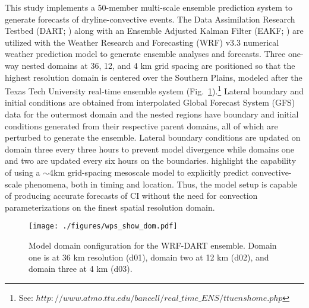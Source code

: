 \documentclass{ttuthes2007}
\newcommand{\tab}{\hspace*{2em}}  %
\begin{document}
\tab This study implements a 50-member multi-scale ensemble prediction system to generate forecasts of dryline-convective events. The Data Assimilation Research Testbed (DART; \citealt{Andersonetal2009}) along with an Ensemble Adjusted Kalman Filter (EAKF; \citealt{Anderson2001}) are utilized with the Weather Research and Forecasting (WRF) v3.3 numerical weather prediction model to generate ensemble analyses and forecasts. Three one-way nested domains at 36, 12, and 4 km grid spacing are positioned so that the highest resolution domain is centered over the Southern Plains, modeled after the Texas Tech University real-time ensemble system (Fig.~\ref{domain}).\footnote{See: $http://www.atmo.ttu.edu/bancell/real\_time\_ENS/ttuenshome.php$} Lateral boundary and initial conditions are obtained from interpolated Global Forecast System (GFS) data for the outermost domain and the nested regions have boundary and initial conditions generated from their respective parent domains, all of which are perturbed to generate the ensemble. Lateral boundary conditions are updated on domain three every three hours to prevent model divergence while domains one and two are updated every six hours on the boundaries. \cite{Kainetal2013} highlight the capability of using a $\sim$4km grid-spacing mesoscale model to explicitly predict convective-scale phenomena, both in timing and location. Thus, the model setup is capable of producing accurate forecasts of CI without the need for convection parameterizations on the finest spatial resolution domain. \\

\begin{figure}[t]
  \centering
  \noindent\texttt{[image: ./figures/wps\_show\_dom.pdf]}\\
  \caption{Model domain configuration for the WRF-DART ensemble. Domain one is at 36 km resolution (d01), domain two at 12 km (d02), and domain three at 4 km (d03).}
\label{domain}
\end{figure}
\end{document}
